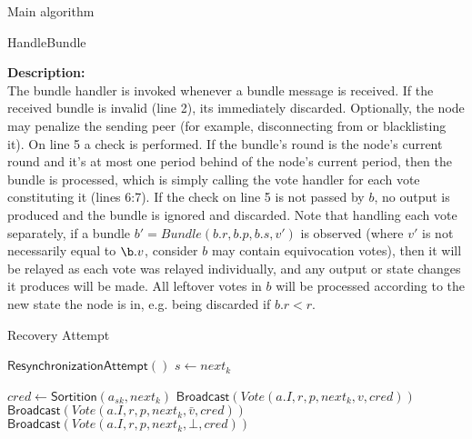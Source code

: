 \documentclass[10pt,a4paper]{article}
\begin{document}
\begin{section}{Main algorithm}
\begin{subsection}{HandleBundle}
\begin{algorithm}[H]
\begin{algorithmic}[1]

        \EndFunction
        \end{algorithmic}
        \caption{\underline{HandleBundle}}
    \end{algorithm}
    
    
    \noindent \textbf{Description:}\\
The bundle handler is invoked whenever a bundle message is received. 
If the received bundle is invalid (line 2), its immediately discarded. Optionally, the node may
penalize the sending peer (for example, disconnecting from or blacklisting it).
On line 5 a check is performed. If the bundle's round is the node's current round
and it's at most one period behind of the node's current period, 
then the bundle is processed, which is simply calling the vote handler for each 
vote constituting it (lines 6:7). If the check on line 5 is not passed by $b$, no output is produced
and the bundle is ignored and discarded.
Note that handling each vote separately, if a bundle $b\prime = Bundle(b.r, b.p, b.s, v\prime)$ is observed
(where $v\prime$ is not necessarily equal to $\b.v$, consider $b$ may contain equivocation votes), then it will be relayed
as each vote was relayed individually, and any output or state changes it produces will be made. All leftover votes 
in $b$ will be processed according to the new state the node is in, e.g. being discarded if $b.r < r$.
    
\end{subsection}


\begin{subsection}{Recovery Attempt}\label{ssect:Recovery}

    \begin{algorithm}[H]
        \begin{algorithmic}[1]

        \State $\mathsf{ResynchronizationAttempt}()$
        \State $s \gets next_k$
    
            \State $cred \gets 
            \mathsf{\mathsf{Sortition}}(a_{sk}, next_k)$
                    \State $\mathsf{Broadcast}(Vote(a.I, r, p, next_k, v, cred))$
                    \State $\mathsf{Broadcast}(Vote(a.I, r, p, next_k, \bar{v}, cred))$
                \Else
                    \State $\mathsf{Broadcast}(Vote(a.I, r, p, next_k, \bot, cred))$
                \EndIf
            \EndIf
        \EndFor



\end{algorithmic}
\end{algorithm}
\end{subsection}
\end{section}
\end{document}
